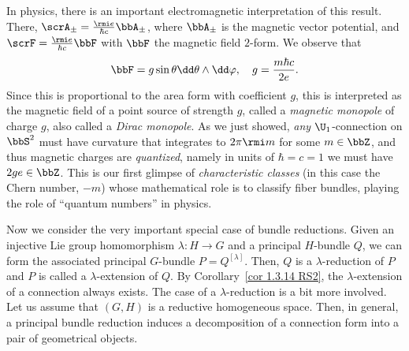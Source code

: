 \begin{example}
    In physics, there is an important electromagnetic interpretation of this result. There, $\scrA_\pm=\frac{\rmi e}{\hbar c}\bbA_\pm$, where $\bbA_\pm$ is the magnetic vector potential, and $\scrF=\frac{\rmi e}{\hbar c} \bbF$ with $\bbF$ the magnetic field $2$-form. We observe that
    \[\bbF =g\sin\theta \dd\theta\wedge\dd\varphi,\quad g=\frac{m\hbar c}{2e}.\]
    Since this is proportional to the area form with coefficient $g$, this is interpreted as the magnetic field of a point source of strength $g$, called a \emph{magnetic monopole} of charge $g$, also called a \emph{Dirac monopole}. As we just showed, \emph{any} $\U_1$-connection on $\bbS^2$ must have curvature that integrates to $2\pi \rmi m$ for some $m\in \bbZ$, and thus magnetic charges are \emph{quantized}, namely in units of $\hbar=c=1$ we must have $2ge\in\bbZ$. This is our first glimpse of \emph{characteristic classes} (in this case the Chern number, $-m$) whose mathematical role is to classify fiber bundles,  playing the role of ``quantum numbers'' in physics.
\end{example}



Now we consider the very important special case of bundle reductions. Given an injective Lie group homomorphism $\lambda:H\to G$ and a principal $H$-bundle $Q$, we can form the associated principal $G$-bundle $P=Q^{[\lambda]}$. Then, $Q$ is a $\lambda$-reduction of $P$ and $P$ is called a $\lambda$-extension of $Q$. By Corollary~\ref{cor 1.3.14 RS2}, the $\lambda$-extension of a connection always exists. The case of a $\lambda$-reduction is a bit more involved. Let us assume that $(G,H)$ is a reductive homogeneous space. Then, in general, a principal bundle reduction induces a decomposition of a connection form into a pair of geometrical objects.

